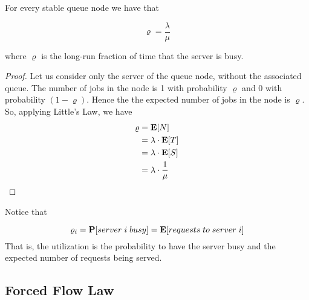 \begin{theorem}
\label{thm:Utilization-Law-2}	
	For every stable queue node we have that
	
	\begin{equation}
	\varrho = \frac{\lambda}{\mu}
	\end{equation}
	
	where $\varrho$ is the long-run fraction of time that the server is busy.
	
	\begin{proof}
		Let us consider only the server of the queue node, without the associated queue. The number of jobs in the node is 1 with probability $\varrho$ and 0 with probability $(1-\varrho)$. Hence the the expected number of jobs in the node is $\varrho$.
		So, applying Little's Law, we have
		\begin{equation*}
			\begin{split}
			\varrho & = \mathbf{E}[N] \\
					& = \lambda \cdot \mathbf{E}[T] \\
					& = \lambda \cdot \mathbf{E}[S] \\
					& = \lambda \cdot \frac{1}{\mu}
			\end{split}
		\end{equation*}
	\end{proof}
\end{theorem}

Notice that

\begin{equation}
\varrho_{i} = \mathbf{P}[server \; i \; busy] = \mathbf{E}[requests \; to \; server \; i]
\end{equation}
That is, the utilization is the probability to have the server busy and the expected number of requests being served.




\subsection{Forced Flow Law}
\label{sec:Forced-Flow-Law}

